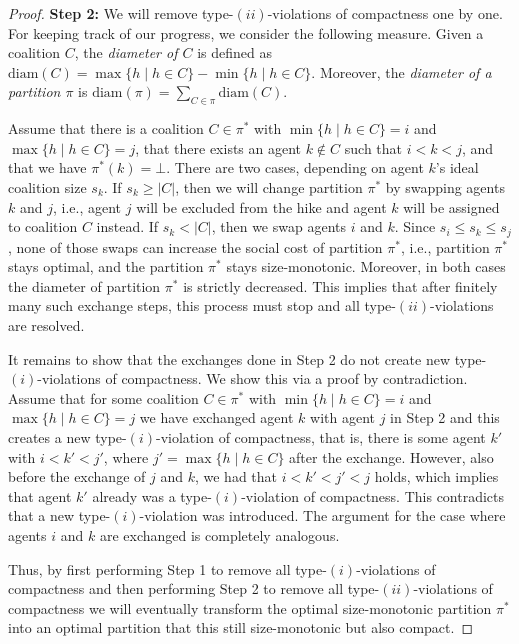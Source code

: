 \documentclass[a4paper,UKenglish,cleveref, autoref, thm-restate]{lipics-v2021}
\newcommand{\set}[1]{\{#1\}}
\begin{document}
\begin{proof}
\textbf{Step 2:} We will remove type-$(ii)$-violations of compactness one by one. For keeping track of our progress, we consider the following measure.
Given a coalition $C$, the \emph{diameter of $C$} is defined as $\text{diam}(C)= \max\set{h \mid h\in C} - \min\set{h \mid h\in C}$. Moreover, the \emph{diameter of a partition $\pi$} is $\text{diam}(\pi)= \sum_{C\in\pi}\text{diam}(C)$. 

Assume that there is a coalition $C\in \pi^*$ with $\min\set{h \mid h \in C}=i$ and $\max\set{h \mid h\in C}=j$, that there exists an agent $k\not\in C$ such that $i<k<j$, and that we have $\pi^*(k) = \bot$. There are two cases, depending on agent $k$'s ideal coalition size $s_k$. If $s_k \geq |C|$, then we will change partition $\pi^*$ by swapping agents $k$ and $j$, i.e., agent $j$ will be excluded from the hike and agent $k$ will be assigned to coalition $C$ instead. If $s_k < |C|$, then we swap agents $i$ and $k$. Since $s_i \leq s_k \leq s_j$, none of those swaps can increase the social cost of partition $\pi^*$, i.e., partition $\pi^*$ stays optimal, and the partition $\pi^*$ stays size-monotonic. Moreover, in both cases the diameter of partition $\pi^*$ is strictly decreased. This implies that after finitely many such exchange steps, this process must stop and all type-$(ii)$-violations are resolved.  

It remains to show that the exchanges done in Step 2 do not create new type-$(i)$-violations of compactness. We show this via a proof by contradiction. Assume that for some coalition $C \in \pi^*$ with $\min\set{h \mid h \in C}=i$ and $\max\set{h \mid h\in C}=j$ we have exchanged agent $k$ with agent $j$ in Step 2 and this creates a new type-$(i)$-violation of compactness, that is, there is some agent $k'$ with $i<k'<j'$, where $j'=\max\set{h \mid h\in C}$ after the exchange. However, also before the exchange of $j$ and $k$, we had that $i<k'<j'<j$ holds, which implies that agent $k'$ already was a type-$(i)$-violation of compactness. This contradicts that a new type-$(i)$-violation was introduced. The argument for the case where agents $i$ and $k$ are exchanged is completely analogous.  

Thus, by first performing Step 1 to remove all type-$(i)$-violations of compactness and then performing Step 2 to remove all type-$(ii)$-violations of compactness we will eventually transform the optimal size-monotonic partition $\pi^*$ into an optimal partition that this still size-monotonic but also compact. 
\end{proof}
\end{document}
